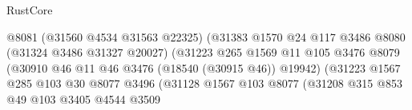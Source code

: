 \begin{lexlean}{RustCore}
\begin{coremodule}
                                                  @8081
                                                  (@31560 @4534 @31563 @22325)
                                                  (@31383
                                                    @1570
                                                    @24
                                                    @117
                                                    @3486
                                                    @8080
                                                    (@31324 @3486 @31327 @20027)
                                                    (@31223
                                                      @265
                                                      @1569
                                                      @11
                                                      @105
                                                      @3476
                                                      @8079
                                                      (@30910
                                                        @46
                                                        @11
                                                        @46
                                                        @3476
                                                        (@18540 (@30915 @46))
                                                        @19942)
                                                      (@31223
                                                        @1567
                                                        @285
                                                        @103
                                                        @30
                                                        @8077
                                                        @3496
                                                        (@31128
                                                          @1567
                                                          @103
                                                          @8077
                                                          (@31208
                                                            @315
                                                            @853
                                                            @49
                                                            @103
                                                            @3405
                                                            @4544
                                                            @3509

\end{coremodule}
\end{lexlean}
